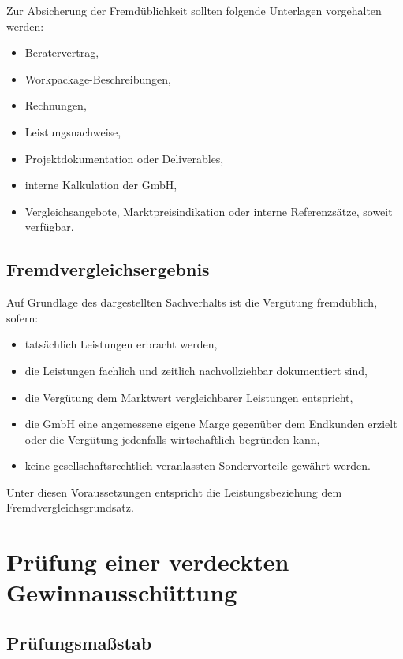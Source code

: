 \documentclass[11pt,a4paper]{article}
\begin{document}
Zur Absicherung der Fremdüblichkeit sollten folgende Unterlagen vorgehalten werden:

\begin{itemize}
    \item Beratervertrag,
    \item Workpackage-Beschreibungen,
    \item Rechnungen,
    \item Leistungsnachweise,
    \item Projektdokumentation oder Deliverables,
    \item interne Kalkulation der GmbH,
    \item Vergleichsangebote, Marktpreisindikation oder interne Referenzsätze, soweit verfügbar.
\end{itemize}

\subsection{Fremdvergleichsergebnis}

Auf Grundlage des dargestellten Sachverhalts ist die Vergütung fremdüblich, sofern:

\begin{itemize}
    \item tatsächlich Leistungen erbracht werden,
    \item die Leistungen fachlich und zeitlich nachvollziehbar dokumentiert sind,
    \item die Vergütung dem Marktwert vergleichbarer Leistungen entspricht,
    \item die GmbH eine angemessene eigene Marge gegenüber dem Endkunden erzielt oder die Vergütung jedenfalls wirtschaftlich begründen kann,
    \item keine gesellschaftsrechtlich veranlassten Sondervorteile gewährt werden.
\end{itemize}

Unter diesen Voraussetzungen entspricht die Leistungsbeziehung dem Fremdvergleichsgrundsatz.

\section{Prüfung einer verdeckten Gewinnausschüttung}

\subsection{Prüfungsmaßstab}
\end{document}
